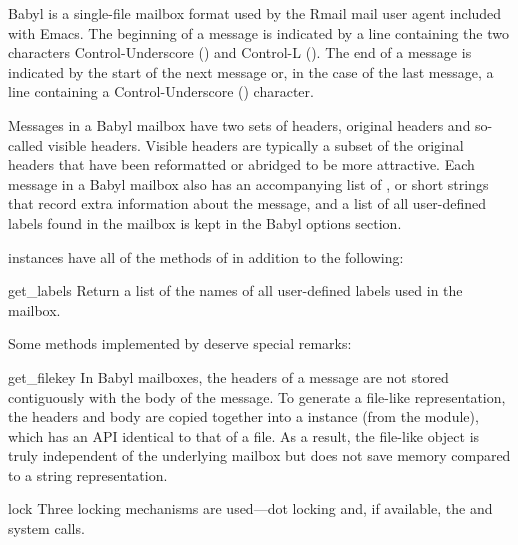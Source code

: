 Babyl is a single-file mailbox format used by the Rmail mail user agent
included with Emacs. The beginning of a message is indicated by a line
containing the two characters Control-Underscore
() and Control-L ().
The end of a message is indicated by the start of the next message or, in the
case of the last message, a line containing a Control-Underscore
() character.

Messages in a Babyl mailbox have two sets of headers, original headers and
so-called visible headers. Visible headers are typically a subset of the
original headers that have been reformatted or abridged to be more attractive.
Each message in a Babyl mailbox also has an accompanying list of ,
or short strings that record extra information about the message, and a list of
all user-defined labels found in the mailbox is kept in the Babyl options
section.

 instances have all of the methods of  in addition
to the following:

\begin{methoddesc}{get_labels}{}
Return a list of the names of all user-defined labels used in the mailbox.
\end{methoddesc}

Some  methods implemented by  deserve special
remarks:

\begin{methoddesc}{get_file}{key}
In Babyl mailboxes, the headers of a message are not stored contiguously with
the body of the message. To generate a file-like representation, the headers
and body are copied together into a  instance (from the
 module), which has an API identical to that of a file. As a
result, the file-like object is truly independent of the underlying mailbox but
does not save memory compared to a string representation.
\end{methoddesc}

\begin{methoddesc}{lock}{}
Three locking mechanisms are used---dot locking and, if available, the
 and  system calls.
\end{methoddesc}

